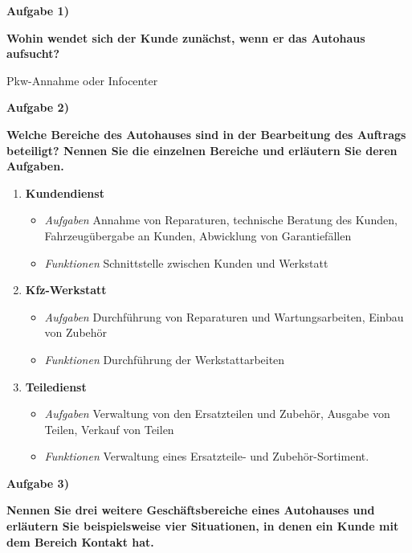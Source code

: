 \textbf{Aufgabe 1)}

\textbf{Wohin wendet sich der Kunde zunächst, wenn er das Autohaus
aufsucht?}

Pkw-Annahme oder Infocenter

\textbf{Aufgabe 2)}

\textbf{Welche Bereiche des Autohauses sind in der Bearbeitung des
Auftrags beteiligt? Nennen Sie die einzelnen Bereiche und erläutern Sie
deren Aufgaben.}

\begin{enumerate}
\item
  \textbf{Kundendienst}

  \begin{itemize}
  \item
    \emph{Aufgaben} Annahme von Reparaturen, technische Beratung des
    Kunden, Fahrzeugübergabe an Kunden, Abwicklung von Garantiefällen
  \item
    \emph{Funktionen} Schnittstelle zwischen Kunden und Werkstatt
  \end{itemize}
\item
  \textbf{Kfz-Werkstatt}

  \begin{itemize}
  \item
    \emph{Aufgaben} Durchführung von Reparaturen und Wartungsarbeiten,
    Einbau von Zubehör
  \item
    \emph{Funktionen} Durchführung der Werkstattarbeiten
  \end{itemize}
\item
  \textbf{Teiledienst}

  \begin{itemize}
  \item
    \emph{Aufgaben} Verwaltung von den Ersatzteilen und Zubehör, Ausgabe
    von Teilen, Verkauf von Teilen
  \item
    \emph{Funktionen} Verwaltung eines Ersatzteile- und
    Zubehör-Sortiment.
  \end{itemize}
\end{enumerate}

\textbf{Aufgabe 3)}

\textbf{Nennen Sie drei weitere Geschäftsbereiche eines Autohauses und
erläutern Sie beispielsweise vier Situationen, in denen ein Kunde mit
dem Bereich Kontakt hat.}

